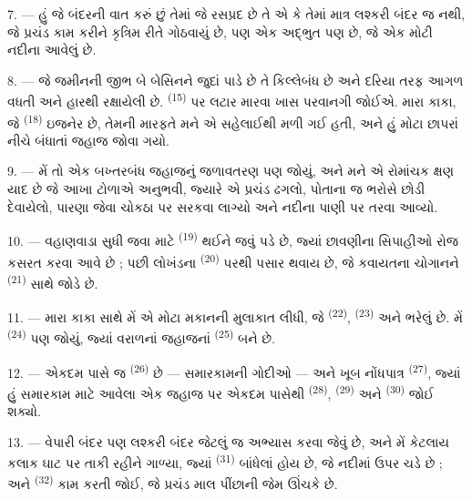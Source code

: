 \VUsaut{3.0mm}
\VUsaut{3.0mm}

7. --- હું જે બંદરની વાત કરું છું તેમાં જે રસપ્રદ છે તે એ કે તેમાં માત્ર
લશ્કરી બંદર જ નથી, જે પ્રચંડ કામ કરીને કૃત્રિમ રીતે ગોઠવાયું છે, પણ એક
અદ્ભુત  પણ છે, જે એક મોટી નદીના 
આવેલું છે.

8. --- જે જમીનની જીભ બે બેસિનને જુદાં પાડે છે તે કિલ્લેબંધ છે અને
દરિયા તરફ આગળ વધતી  અને  હારથી
રક્ષાયેલી છે.  \textsuperscript{(15)} પર લટાર મારવા ખાસ
પરવાનગી જોઈએ. મારા કાકા, જે  \textsuperscript{(18)}
ઇજનેર છે, તેમની મારફતે મને એ સહેલાઈથી મળી ગઈ હતી, અને હું મોટા છાપરાં
નીચે બંધાતાં જહાજ જોવા ગયો.

9. --- મેં તો એક બખ્તરબંધ જહાજનું જળાવતરણ પણ જોયું, અને મને એ રોમાંચક
ક્ષણ યાદ છે જે આખા ટોળાએ અનુભવી, જ્યારે એ પ્રચંડ ઢગલો, પોતાના જ ભરોસે
છોડી દેવાયેલો, પારણા જેવા ચોકઠા પર સરકવા લાગ્યો અને નદીના પાણી પર તરવા
આવ્યો.

10. --- વહાણવાડા સુધી જવા માટે 
\textsuperscript{(19)} થઈને જવું પડે છે, જ્યાં છાવણીના સિપાહીઓ રોજ કસરત
કરવા આવે છે ; પછી લોખંડના  \textsuperscript{(20)} પરથી
પસાર થવાય છે, જે કવાયતના ચોગાનને 
\textsuperscript{(21)} સાથે જોડે છે.

\VUsaut{3.0mm}
\VUsaut{3.0mm}

11. --- મારા કાકા સાથે મેં એ મોટા મકાનની મુલાકાત લીધી, જે 
\textsuperscript{(22)},  \textsuperscript{(23)} અને
 ભરેલું છે. મેં 
\textsuperscript{(24)} પણ જોયું, જ્યાં વરાળનાં જહાજનાં 
\textsuperscript{(25)} બને છે.

12. --- એકદમ પાસે જ  \textsuperscript{(26)} છે —
સમારકામની ગોદીઓ — અને ખૂબ નોંધપાત્ર 
\textsuperscript{(27)}, જ્યાં હું સમારકામ માટે આવેલા એક જહાજ પર એકદમ
પાસેથી  \textsuperscript{(28)}, 
\textsuperscript{(29)} અને  \textsuperscript{(30)} જોઈ
શક્યો.

13. --- વેપારી બંદર પણ લશ્કરી બંદર જેટલું જ અભ્યાસ કરવા જેવું છે, અને
મેં કેટલાય કલાક ઘાટ પર તાકી રહીને ગાળ્યા, જ્યાં  \textsuperscript{(31)} બાંધેલાં હોય છે, જે નદીમાં ઉપર ચડે છે ; અને
 \textsuperscript{(32)} કામ કરતી જોઈ, જે
પ્રચંડ માલ પીંછાની જેમ ઊંચકે છે.

